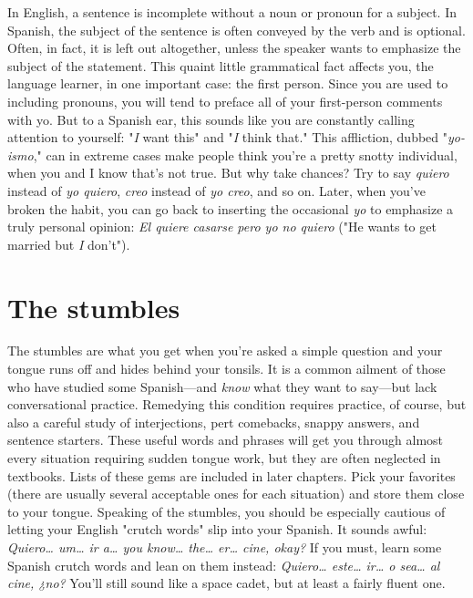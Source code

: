 \documentclass[14pt,a4paper,oneside]{memoir}
\begin{document}
In English, a sentence is incomplete without a noun or pronoun for a subject. In Spanish, the subject of the sentence is often conveyed by the verb and is optional. Often, in fact, it is left out altogether, unless the speaker wants to emphasize the subject of the
statement. This quaint little grammatical fact affects you, the language
learner, in one important case: the first person. Since you are used to
including pronouns, you will tend to preface all of your first-person
comments with yo. But to a Spanish ear, this sounds like you are constantly calling attention to yourself: "\emph{I} want this" and "\emph{I} think that."
This affliction, dubbed "\emph{yo-ismo}," can in extreme cases make people
think you're a pretty snotty individual, when you and I know that's not
true. But why take chances? Try to say \emph{quiero} instead of \emph{yo quiero},
\emph{creo} instead of \emph{yo creo}, and so on. Later, when you've broken the habit,
you can go back to inserting the occasional \emph{yo} to emphasize a truly
personal opinion: \emph{El quiere casarse pero yo no quiero} ("He wants to
get married but \emph{I} don't").

\section{The stumbles}

The stumbles are what you get when you're asked a simple
question and your tongue runs off and hides behind your tonsils. It is a
common ailment of those who have studied some Spanish---and \emph{know}
what they want to say---but lack conversational practice. Remedying
this condition requires practice, of course, but also a careful study of
interjections, pert comebacks, snappy answers, and sentence starters.
These useful words and phrases will get you through almost every
situation requiring sudden tongue work, but they are often neglected
in textbooks. Lists of these gems are included in later chapters. Pick
your favorites (there are usually several acceptable ones for each situation) and store them close to your tongue.
Speaking of the stumbles, you should be especially cautious of
letting your English "crutch words" slip into your Spanish. It sounds
awful: \emph{Quiero\ldots{} um\ldots{} ir a\ldots{} you know\ldots{} the\ldots{} er\ldots{} cine,
okay?} If you must, learn some Spanish crutch words and lean on them
instead: \emph{Quiero\ldots{} este\ldots{} ir\ldots{} o sea\ldots{} al cine, ¿no?} You'll still
sound like a space cadet, but at least a fairly fluent one.
\end{document}
